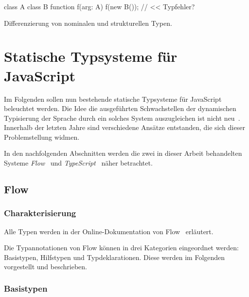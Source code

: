 \bigbreak
\begin{listing}[htb]
\begin{textcode}
class A {}
class B {}
function f(arg: A) {}
f(new B()); // << Typfehler?
\end{textcode}
\listingvspace
\caption{Differenzierung von nominalen und strukturellen Typen.}
\label{code:type-equivalence}
\end{listing}




\section{Statische Typsysteme für JavaScript}
\label{sec:static-typesystems-for-js}

Im Folgenden sollen nun bestehende statische Typsysteme für JavaScript beleuchtet werden. Die Idee die ausgeführten Schwachstellen der dynamischen Typisierung der Sprache durch ein solches System auszugleichen ist nicht neu~\autocite[2]{FLOW:PAPER}. Innerhalb der letzten Jahre sind verschiedene Ansätze entstanden, die sich dieser Problemstellung widmen.




In den nachfolgenden Abschnitten werden die zwei in dieser Arbeit behandelten Systeme \textit{Flow}~\autocite{FLOW:PAPER} und \textit{TypeScript}~\autocite{TYPESCRIPT:SPEC} näher betrachtet.

\subsection{Flow}
\label{subsec:flow}

\subsubsection{Charakterisierung}

Alle Typen werden in der Online-Dokumentation von Flow~\autocite{FLOW:TYPE_ANNOTATIONS} erläutert.

Die Typannotationen von Flow können in drei Kategorien eingeordnet werden: Basistypen, Hilfstypen und Typdeklarationen. Diese werden im Folgenden vorgestellt und beschrieben.

\subsubsection{Basistypen}
\label{subsec:flow:base-types}

